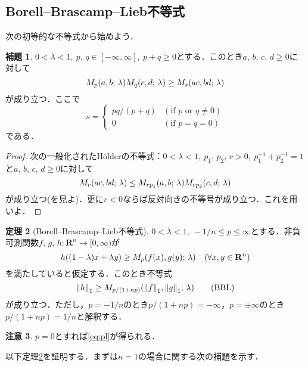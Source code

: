 \documentclass[a4j]{ltjsarticle}
\newcommand{\Rset}{\mathbf{R}}
\newcommand{\1}{\bm{1}}
\newcommand{\M}[4]{M_{#1}\qty(#2,#3;\,#4)}
\numberwithin{equation}{section}
\theoremstyle{definition}
\newtheorem{thm}{定理}[section]
\newtheorem{lem}[thm]{補題}
\newtheorem{rmk}[thm]{注意}
\begin{document}
\subsection{Borell--Brascamp--Lieb不等式}
次の初等的な不等式から始めよう．
\begin{lem}\label{lem:ave_ineq}
    $0<\lambda<1,\ p,\,q\in[-\infty,\infty],\ p+q\geq0$とする．このとき$a,\,b,\,c,\,d\geq0$に対して
    \begin{equation}
        \M{p}{a}{b}{\lambda}\M{q}{c}{d}{\lambda}\geq \M{s}{ac}{bd}{\lambda}
    \end{equation}
    が成り立つ．ここで
    \begin{equation}
        s=\begin{cases}
            pq/(p+q) & (\text{if $p$ or $q\neq0$})\\
            0 & (\text{if } p=q=0)
        \end{cases}
    \end{equation}
    である．
\end{lem}
\begin{proof}
    次の一般化されたH\"olderの不等式：$0<\lambda<1,\ p_1,\,p_2,\,r>0,\ p_1^{-1}+p_2^{-1}=1$と$a,\,b,\,c,\,d\geq0$に対して
    \begin{equation}
        \M{r}{ac}{bd}{\lambda}\leq \M{rp_1}{a}{b}{\lambda}\M{rp_2}{c}{d}{\lambda}
    \end{equation}
    が成り立つ(\cite{HLP}を見よ)．更に$r<0$ならば反対向きの不等号が成り立つ．これを用いよ．
\end{proof}
\begin{thm}[Borell--Brascamp--Lieb不等式]\label{thm:bbl}
    $0<\lambda<1,\ -1/n\leq p\leq \infty$とする．非負可測関数$f,\,g,\,h\colon \Rset^n\to[0,\infty)$が
    \begin{equation}
        h((1-\lambda)x+\lambda y)\geq \M{p}{f(x)}{g(y)}{\lambda}\quad (\forall x,y\in\Rset^n)
    \end{equation}
    を満たしていると仮定する．このとき不等式
    \begin{equation}
        \norm{h}_1\geq \M{p/(1+np)}{\norm{f}_1}{\norm{g}_1}{\lambda}\label{eq:bbl}\tag{BBL}
    \end{equation}    
    が成り立つ．ただし，$p=-1/n$のとき$p/(1+np)=-\infty$，$p=\pm\infty$のとき$p/(1+np)=1/n$と解釈する．
\end{thm}
\begin{rmk}
    $p=0$とすれば\eqref{eq:pl}が得られる．
\end{rmk}
以下定理\ref{thm:bbl}を証明する．まずは$n=1$の場合に関する次の補題を示す．
\end{document}
